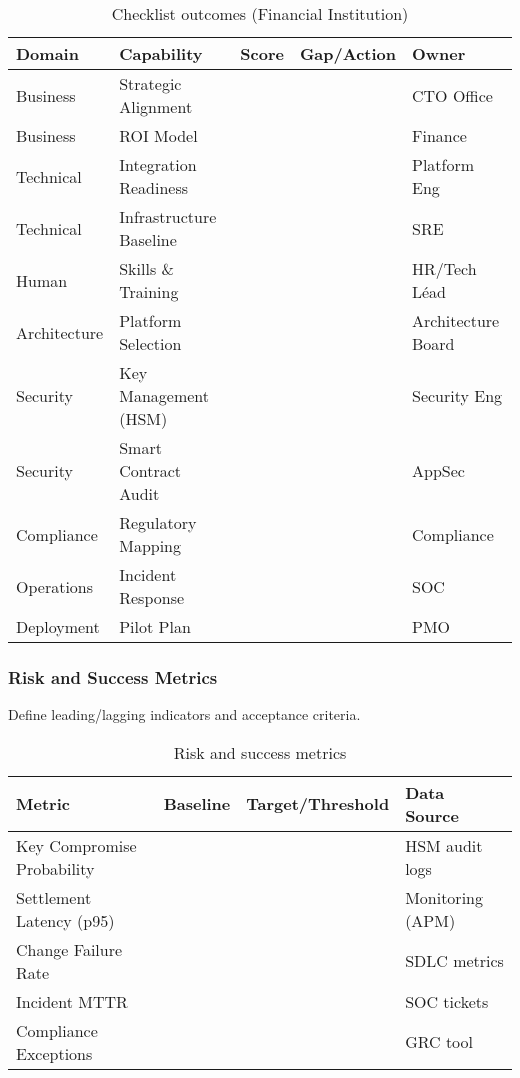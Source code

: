 \begin{table}[H]
\centering
\caption{Checklist outcomes (Financial Institution)}
\begin{tabularx}{0.98\linewidth}{l l c X l}
\toprule
\textbf{Domain} & \textbf{Capability} & \textbf{Score} & \textbf{Gap/Action} & \textbf{Owner} \\
\midrule
Business & Strategic Alignment &  &  & CTO Office \\
Business & ROI Model &  &  & Finance \\
Technical & Integration Readiness &  &  & Platform Eng \\
Technical & Infrastructure Baseline &  &  & SRE \\
Human & Skills \& Training &  &  & HR/Tech L\'ead \\
Architecture & Platform Selection &  &  & Architecture Board \\
Security & Key Management (HSM) &  &  & Security Eng \\
Security & Smart Contract Audit &  &  & AppSec \\
Compliance & Regulatory Mapping &  &  & Compliance \\
Operations & Incident Response &  &  & SOC \\
Deployment & Pilot Plan &  &  & PMO \\
\bottomrule
\end{tabularx}
\label{tab:fi_checklist}
\end{table}

\subsubsection{Risk and Success Metrics}
Define leading/lagging indicators and acceptance criteria.

\begin{table}[H]
\centering
\caption{Risk and success metrics}
\begin{tabularx}{0.98\linewidth}{l X X l}
\toprule
\textbf{Metric} & \textbf{Baseline} & \textbf{Target/Threshold} & \textbf{Data Source} \\
\midrule
Key Compromise Probability &  &  & HSM audit logs \\
Settlement Latency (p95) &  &  & Monitoring (APM) \\
Change Failure Rate &  &  & SDLC metrics \\
Incident MTTR &  &  & SOC tickets \\
Compliance Exceptions &  &  & GRC tool \\
\bottomrule
\end{tabularx}
\label{tab:fi_metrics}
\end{table}

